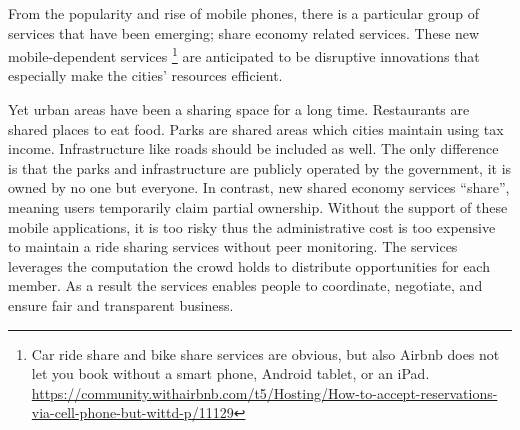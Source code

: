 From the popularity and rise of mobile phones, there is a particular group of services that have been emerging; share economy related services. These new mobile-dependent services
\footnote{Car ride share and bike share services are obvious, but also Airbnb does not let you book without
a smart phone, Android tablet, or an iPad.
\url{https://community.withairbnb.com/t5/Hosting/How-to-accept-reservations-via-cell-phone-but-wittd-p/11129}}
are anticipated to be disruptive innovations that especially make the cities’ resources efficient.

Yet urban areas have been a sharing space for a long time. Restaurants are shared places to eat food.
Parks are shared areas which cities maintain using tax income. Infrastructure like roads should be included as well.
The only difference is that the parks and infrastructure are publicly operated by the government, it is owned by no one but everyone.
In contrast, new shared economy services ``share'', meaning users temporarily claim partial ownership. Without the support of these mobile applications, it is too risky thus the administrative cost is too expensive to maintain a ride sharing services without peer monitoring. The services leverages the computation the crowd holds to distribute opportunities for each member. As a result the services enables people to coordinate, negotiate, and ensure fair and transparent business.

